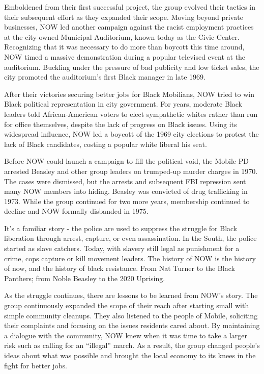 \documentclass[
]{book}
\begin{document}
Emboldened from their first successful project, the group evolved their tactics in their subsequent effort as they expanded their scope. Moving beyond private businesses, NOW led another campaign against the racist employment practices at the city-owned Municipal Auditorium, known today as the Civic Center. Recognizing that it was necessary to do more than boycott this time around, NOW timed a massive demonstration during a popular televised event at the auditorium. Buckling under the pressure of bad publicity and low ticket sales, the city promoted the auditorium's first Black manager in late 1969.

After their victories securing better jobs for Black Mobilians, NOW tried to win Black political representation in city government. For years, moderate Black leaders told African-American voters to elect sympathetic whites rather than run for office themselves, despite the lack of progress on Black issues. Using its widespread influence, NOW led a boycott of the 1969 city elections to protest the lack of Black candidates, costing a popular white liberal his seat.

Before NOW could launch a campaign to fill the political void, the Mobile PD arrested Beasley and other group leaders on trumped-up murder charges in 1970. The cases were dismissed, but the arrests and subsequent FBI repression sent many NOW members into hiding. Beasley was convicted of drug trafficking in 1973. While the group continued for two more years, membership continued to decline and NOW formally disbanded in 1975.

It's a familiar story - the police are used to suppress the struggle for Black liberation through arrest, capture, or even assassination. In the South, the police started as slave catchers. Today, with slavery still legal as punishment for a crime, cops capture or kill movement leaders. The history of NOW is the history of now, and the history of black resistance. From Nat Turner to the Black Panthers; from Noble Beasley to the 2020 Uprising.

As the struggle continues, there are lessons to be learned from NOW's story. The group continuously expanded the scope of their reach after starting small with simple community cleanups. They also listened to the people of Mobile, soliciting their complaints and focusing on the issues residents cared about. By maintaining a dialogue with the community, NOW knew when it was time to take a larger risk such as calling for an ``illegal'' march. As a result, the group changed people's ideas about what was possible and brought the local economy to its knees in the fight for better jobs.
\end{document}
